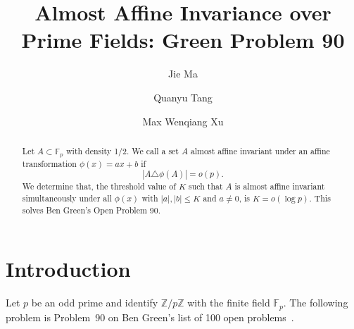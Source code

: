 \documentclass[11pt,letterpaper,reqno]{amsart}
\theoremstyle{definition}
\newcommand{\F}{\mathbb F}
\newcommand{\Z}{\mathbb Z}
\newcommand{\1}{\mathbf 1}
\begin{document}
\title{Almost Affine Invariance over Prime Fields: Green Problem 90}


\author{Jie Ma}
\address{School of Mathematical Sciences, University of Science and Technology of China, Hefei, Anhui 230026, and Yau Mathematical Sciences Center, Tsinghua University, Beijing 100084, China}

\author{Quanyu Tang}
\address{School of Mathematics and Statistics, Xi'an Jiaotong University, Xi'an 710049, P. R. China}


\author{Max Wenqiang Xu}
\address{Courant Institute of Mathematical Sciences, 251 Mercer Street, New York 10012, USA}


\begin{abstract}
 Let $A\subset \mathbb{F}_p$ with density 1/2. We call a   set $A$ almost affine invariant under an affine transformation $\phi(x)=ax+b$ if
\[|A \triangle \phi(A)| =o(p).\]
We determine that, the threshold value of $K$ such that $A$ is almost affine invariant simultaneously under all $\phi(x)$ with $|a|, |b|\le K$ and $a\neq 0$, is $K=o(\log p)$. This solves Ben Green's Open Problem 90. 
\end{abstract}








\maketitle



\section{Introduction}

Let $p$ be an odd prime and identify $\Z/p\Z$ with the finite field $\F_p$. 
The following problem is Problem~90 on Ben Green's list of 100 open problems~\cite{GreenProblems}.
\end{document}
